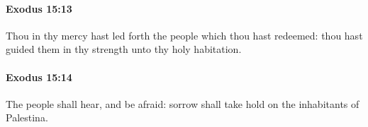 		\paragraph{Exodus 15:13} %
			\label{EXODUS-15-13}

			Thou in thy mercy hast led forth the people which thou hast redeemed: thou hast guided them in thy strength unto thy holy habitation.


		\paragraph{Exodus 15:14} %
			\label{EXODUS-15-14}

			The people shall hear, and be afraid: sorrow shall take hold on the inhabitants of Palestina.


